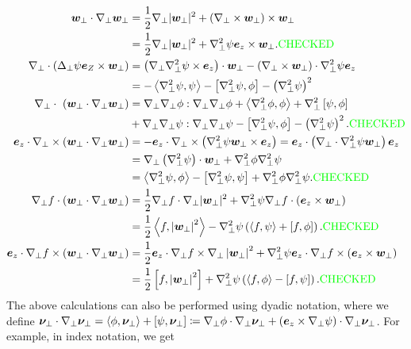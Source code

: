 \documentclass{article}
\newcommand{\np}{\nabla_\perp}
\newcommand{\lap}{\Delta_\perp}
\newcommand{\pth} [1] {\left( #1 \right) }
\newcommand{\br} [1] {\left[ #1 \right] }
\begin{document}
\begin{align} 
    \bm{w}_\perp \cdot\np \bm{w}_\perp &= \frac{1}{2}\np|\bm{w}_\perp|^2 + \pth{\np\times\bm{w}_\perp} \times\bm{w}_\perp \\ 
        &= \frac{1}{2}\np|\bm{w}_\perp|^2 + \np^2\psi\bm{e}_z \times\bm{w}_\perp. \text{\color{green} CHECKED} \label{important identity} \\ 
    \np\cdot\pth{\lap\psi\bm{e}_Z\times\bm{w}_\perp} &= \pth{\np\np^2\psi\times\bm{e}_z} \cdot\bm{w}_\perp - \pth{\np\times\bm{w}_\perp}\cdot \np^2\psi\bm{e}_z \\ 
        &= - \Braket{\np^2\psi, \psi} - \br{\np^2\psi, \phi} - \pth{\np^2\psi}^2 \\ 
    \np\cdot\ \pth{\bm{w}_\perp \cdot\np \bm{w}_\perp} &= \np\np\phi:\np\np\phi + \Braket{\np^2\phi, \phi} + \np^2\br{\psi,\phi} \\ 
        &+ \np\np\psi:\np\np\psi - \br{\np^2\psi, \phi} - \pth{\np^2\psi}^2. \text{\color{green} CHECKED} \\ 
    \bm{e}_z\cdot \np\times \pth{\bm{w}_\perp \cdot\np \bm{w}_\perp} &= -\bm{e}_z\cdot\np\times \pth{\np^2\psi\bm{w}_\perp\times \bm{e}_z} = \bm{e}_z\cdot \pth{\np\cdot\np^2\psi\bm{w}_\perp} \bm{e}_z \\ 
        &= \np\pth{\np^2\psi}\cdot \bm{w}_\perp + \np^2\phi\np^2\psi \\ 
        &= \Braket{\np^2\psi, \phi} - \br{\np^2\psi, \psi} + \np^2\phi\np^2\psi. \text{\color{green} CHECKED} \\ 
    \np f\cdot \pth{\bm{w}_\perp \cdot\np \bm{w}_\perp} &= \frac{1}{2} \np f\cdot\np|\bm{w}_\perp|^2 + \np^2\psi\np f\cdot\pth{\bm{e}_z\times\bm{w}_\perp} \\ 
        &= \frac{1}{2}\Braket{f, \left|\bm{w}_\perp\right|^2} - \np^2\psi\pth{\Braket{f, \psi} + \br{f, \phi}}. \text{\color{green} CHECKED} \\ 
    \bm{e}_z\cdot\np f\times \pth{\bm{w}_\perp \cdot\np \bm{w}_\perp} &= \frac{1}{2}\bm{e}_z\cdot\np f\times\np \left|\bm{w}_\perp\right|^2 + \np^2\psi\bm{e}_z\cdot\np f\times\pth{\bm{e}_z\times\bm{w}_\perp} \\ 
        &= \frac{1}{2}\br{f, \left|\bm{w}_\perp\right|^2} + \np^2\psi\pth{\Braket{f, \phi} - \br{f, \psi}}. \text{\color{green} CHECKED}
\end{align}
The above calculations can also be performed using dyadic notation, where we define $\bm{\nu}_\perp \cdot \np \bm{\nu}_\perp = \Braket{\phi, \bm{\nu}_\perp} + [\psi, \bm{\nu}_\perp] \coloneq \np\phi \cdot \np\bm{\nu}_\perp + (\bm{e}_z \times \np\psi) \cdot \np\bm{\nu}_\perp$. For example, in index notation, we get 
\end{document}
